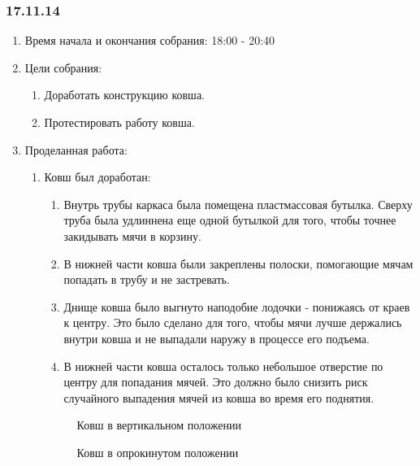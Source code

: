 
\subsubsection{17.11.14}

\begin{enumerate} 
	\item Время начала и окончания собрания:
	18:00 - 20:40
	\item Цели собрания:
	\begin{enumerate}
		\item Доработать конструкцию ковша.
		
		\item Протестировать работу ковша.
		
	\end{enumerate}
	
	\item Проделанная работа:
	\begin{enumerate}
		\item Ковш был доработан:
		\begin{enumerate}
			\item Внутрь трубы каркаса была помещена пластмассовая бутылка. Сверху труба была удлиннена еще одной бутылкой для того, чтобы точнее закидывать мячи в корзину.
			
			\item В нижней части ковша были закреплены полоски, помогающие мячам попадать в трубу и не застревать.
			
			\item Днище ковша было выгнуто наподобие лодочки - понижаясь от краев к центру. Это было сделано для того, чтобы мячи лучше держались внутри ковша и не выпадали наружу в процессе его подъема.
			
			\item В нижней части ковша осталось только небольшое отверстие по центру для попадания мячей. Это должно было снизить риск случайного выпадения мячей из ковша во время его поднятия.
			
		\end{enumerate}
		
	    \begin{figure}[H]
			\begin{minipage}[h]{0.47\linewidth}
				\caption{Ковш в вертикальном положении}
			\end{minipage}
			\hfill
			\begin{minipage}[h]{0.47\linewidth}
				\caption{Ковш в опрокинутом положении}
			\end{minipage}
		\end{figure}
		

\end{enumerate}
\end{enumerate}
